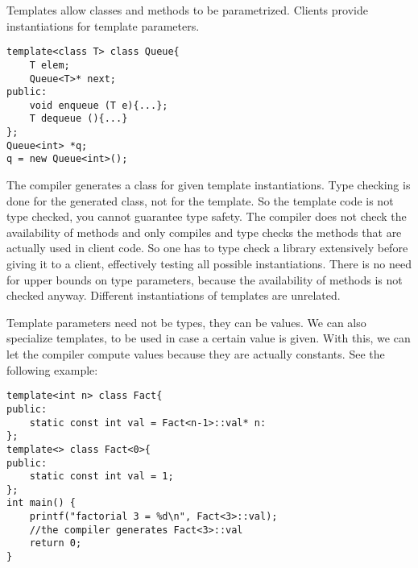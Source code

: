\begin{mytitle}[C++ Templates] Templates allow classes and methods to be parametrized. Clients provide instantiations for template parameters.
\lstset{language = C++}
\begin{lstlisting}
template<class T> class Queue{
    T elem;
    Queue<T>* next;
public:
    void enqueue (T e){...};
    T dequeue (){...}
};
Queue<int> *q;
q = new Queue<int>();
\end{lstlisting}
The compiler generates a class for given template instantiations. Type checking is done for the generated class, not for the template. So the template code is not type checked, you cannot guarantee type safety. The compiler does not check the availability of methods and only compiles and type checks the methods that are actually used in client code. So one has to type check a library extensively before giving it to a client, effectively testing all possible instantiations. There is no need for upper bounds on type parameters, because the availability of methods is not checked anyway. Different instantiations of templates are unrelated.
\end{mytitle}
\begin{mytitle} Template parameters need not be types, they can be values. We can also specialize templates, to be used in case a certain value is given. With this, we can let the compiler compute values because they are actually constants. See the following example:
\lstset{language = C++}
\begin{lstlisting}
template<int n> class Fact{
public:
    static const int val = Fact<n-1>::val* n:
};
template<> class Fact<0>{
public:
    static const int val = 1;
};
int main() {
    printf("factorial 3 = %d\n", Fact<3>::val); 
    //the compiler generates Fact<3>::val
    return 0;
}
\end{lstlisting}
\end{mytitle}
